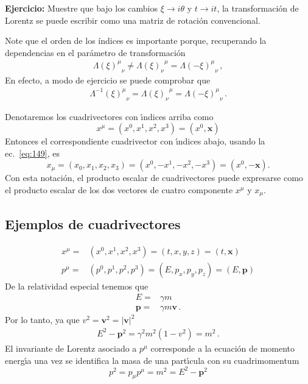 \textbf{Ejercicio:} Muestre que bajo los cambios $\xi\to i\theta$ y $t\to it$, la transformación de Lorentz se puede escribir como una matriz de rotación convencional.

Note que el orden de los índices es importante porque, recuperando la dependencias en el parámetro de transformación
\begin{align}
  {\Lambda(\xi)^{\mu}}_{\nu}\ne {\Lambda(\xi)_{\nu}}^{\mu}={\Lambda(-\xi)^{\mu}}_{\nu}\,,
\end{align}
En efecto, a modo de ejercicio se puede comprobar que
\begin{align}
{\Lambda^{-1}(\xi)^{\mu}}_{\nu} ={\Lambda(\xi)_{\nu}}^{\mu}= {\Lambda(-\xi)^{\mu}}_{\nu}\,.
\end{align}


\begin{frame}
Denotaremos los cuadrivectores con \'\i ndices arriba como
\begin{equation}
  \label{eq:upindx}
  x^\mu=(x^0,x^1,x^2,x^3)=(x^0,\mathbf{x})
\end{equation}
Entonces el correspondiente cuadrivector con \'\i ndices abajo, usando la ec.~\eqref{eq:149}, es
\begin{equation}
  x_\mu=(x_0,x_1,x_2,x_3)=(x^0,-x^1,-x^2,-x^3)=(x^0,-\mathbf{x}).
\end{equation}
Con esta notaci\'on, el producto escalar de cuadrivectores puede expresarse como el producto escalar de los dos vectores de cuatro componente $x^\mu$ y $x_\mu$.
\subsection{Ejemplos de cuadrivectores}
\begin{align}
    x^\mu=&(x^0,x^1,x^2,x^3)=(t,x,y,z)=(t,\mathbf{x})\\
  p^\mu=&(p^0,p^1,p^2,p^3)=(E,p_x,p_y,p_z)=(E,\mathbf{p})
\end{align}
De la relatividad especial tenemos que
\begin{align}
  E=&\gamma m \nonumber\\
  \mathbf{p}=&\gamma m\mathbf{v}\,.
\end{align}
Por lo tanto, ya que $v^2=\mathbf{v}^2=|\mathbf{v}|^2$
\begin{align}
  E^2-\mathbf{p}^2=\gamma^2m^2(1-v^2)=m^2\,.
\end{align}
El invariante de Lorentz asociado a $p^\mu$ corresponde a la ecuaci\'on de momento energ\'\i a una vez se identifica la masa de una part\'\i cula con su cuadrimomentum
\begin{equation}
  p^2=p_\mu p^\mu=m^2=E^2-\mathbf{p}^2
\end{equation}
\end{frame}
